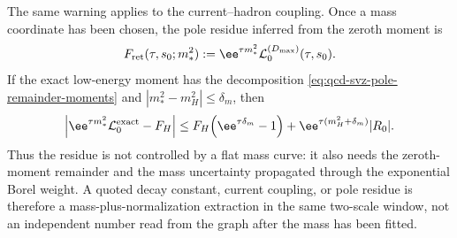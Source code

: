 \begin{controlledapproximation}
The same warning applies to the current--hadron coupling.  Once a mass
coordinate has been chosen, the pole residue inferred from the zeroth moment is
\begin{equation}
  F_{\rm ret}(\tau,s_0;m_*^2)
  :=
  \ee^{\tau m_*^2}\mathcal L_0^{(D_{\max})}(\tau,s_0).
  \label{eq:qcd-svz-retained-residue-coordinate}
\end{equation}
If the exact low-energy moment has the decomposition
\eqref{eq:qcd-svz-pole-remainder-moments} and
\(|m_*^2-m_H^2|\le\delta_m\), then
\begin{equation}
  \left|
  \ee^{\tau m_*^2}\mathcal L_0^{\rm exact}
  -
  F_H
  \right|
  \le
  F_H\!\left(\ee^{\tau\delta_m}-1\right)
  +
  \ee^{\tau(m_H^2+\delta_m)}|R_0| .
  \label{eq:qcd-svz-residue-mass-window-bound}
\end{equation}
Thus the residue is not controlled by a flat mass curve: it also needs the
zeroth-moment remainder and the mass uncertainty propagated through the
exponential Borel weight.  A quoted decay constant, current coupling, or pole
residue is therefore a mass-plus-normalization extraction in the same
two-scale window, not an independent number read from the graph after the mass
has been fitted.
\end{controlledapproximation}

